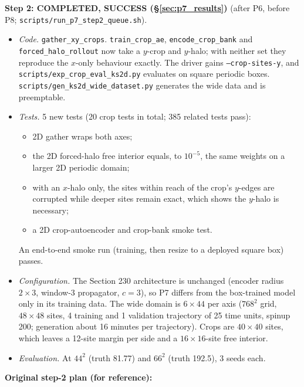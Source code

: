 \documentclass[11pt]{article}
\begin{document}
\textbf{Step 2: COMPLETED, SUCCESS (\S\ref{sec:p7_results})} (after P6, before
P8; \texttt{scripts/run\_p7\_step2\_queue.sh}).
\begin{itemize}[leftmargin=*]
\item \emph{Code.} \texttt{gather\_xy\_crops}. \texttt{train\_crop\_ae},
  \texttt{encode\_crop\_bank} and \texttt{forced\_halo\_rollout} now take a
  $y$-crop and $y$-halo; with neither set they reproduce the $x$-only
  behaviour exactly. The driver gains \texttt{--crop-sites-y}, and
  \texttt{scripts/exp\_crop\_eval\_ks2d.py} evaluates on square periodic
  boxes. \texttt{scripts/gen\_ks2d\_wide\_dataset.py} generates the wide
  data and is preemptable.
\item \emph{Tests.} 5 new tests (20 crop tests in total; 385 related
  tests pass):
  \begin{itemize}[leftmargin=*]
  \item 2D gather wraps both axes;
  \item the 2D forced-halo free interior equals, to $10^{-5}$, the same
    weights on a larger 2D periodic domain;
  \item with an $x$-halo only, the sites within reach of the crop's
    $y$-edges are corrupted while deeper sites remain exact, which shows
    the $y$-halo is necessary;
  \item a 2D crop-autoencoder and crop-bank smoke test.
  \end{itemize}
  An end-to-end smoke run (training, then resize to a deployed square
  box) passes.
\item \emph{Configuration.} The Section 230 architecture is unchanged
  (encoder radius $2\times3$, window-3 propagator, $c{=}3$), so P7
  differs from the box-trained model only in its training data. The
  wide domain is $6\times44$ per axis ($768^2$ grid, $48\times48$ sites,
  4 training and 1 validation trajectory of 25 time units, spinup 200;
  generation about 16 minutes per trajectory). Crops are $40\times40$
  sites, which leaves a 12-site margin per side and a $16\times16$-site
  free interior.
\item \emph{Evaluation.} At $44^2$ (truth 81.77) and $66^2$ (truth
  192.5), 3 seeds each.
\end{itemize}
\textbf{Original step-2 plan (for reference):}
\end{document}
